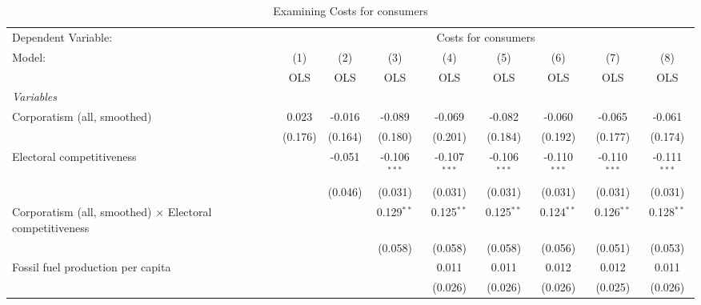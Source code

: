 
\begin{table}[htbp]
   \caption{Examining Costs for consumers}
   \centering
   \begin{tabular}{lcccccccc}
      \toprule
      Dependent Variable: & \multicolumn{8}{c}{Costs for consumers}\\
      Model:                                                          & (1)     & (2)     & (3)            & (4)            & (5)            & (6)            & (7)            & (8)\\  
                                                                      &  OLS    & OLS     & OLS            & OLS            & OLS            & OLS            & OLS            & OLS\\  
      \midrule
      \emph{Variables}\\
      Corporatism (all, smoothed)                                     & 0.023   & -0.016  & -0.089         & -0.069         & -0.082         & -0.060         & -0.065         & -0.061\\   
                                                                      & (0.176) & (0.164) & (0.180)        & (0.201)        & (0.184)        & (0.192)        & (0.177)        & (0.174)\\   
      Electoral competitiveness                                       &         & -0.051  & -0.106$^{***}$ & -0.107$^{***}$ & -0.106$^{***}$ & -0.110$^{***}$ & -0.110$^{***}$ & -0.111$^{***}$\\   
                                                                      &         & (0.046) & (0.031)        & (0.031)        & (0.031)        & (0.031)        & (0.031)        & (0.031)\\   
      Corporatism (all, smoothed) $\times$ Electoral competitiveness  &         &         & 0.129$^{**}$   & 0.125$^{**}$   & 0.125$^{**}$   & 0.124$^{**}$   & 0.126$^{**}$   & 0.128$^{**}$\\   
                                                                      &         &         & (0.058)        & (0.058)        & (0.058)        & (0.056)        & (0.051)        & (0.053)\\   
      Fossil fuel production per capita                               &         &         &                & 0.011          & 0.011          & 0.012          & 0.012          & 0.011\\   
                                                                      &         &         &                & (0.026)        & (0.026)        & (0.026)        & (0.025)        & (0.026)\\   

\end{tabular}
\end{table}
